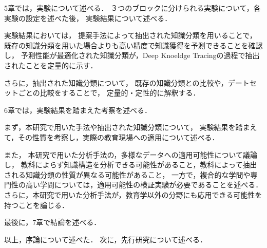 5章では，実験について述べる．
３つのブロックに分けられる実験について，各実験の設定を述べた後，
実験結果について述べる．

実験結果においては，
提案手法によって抽出された知識分類を用いることで，既存の知識分類を用いた場合よりも高い精度で知識獲得を予測できることを確認し，
予測性能が最適化された知識分類が，Deep Knoeldge Tracingの過程で抽出されたことを定量的に示す．

さらに，抽出された知識分類について，
既存の知識分類との比較や，デートセットごとの比較をすることで，
定量的・定性的に解釈する．


6章では，実験結果を踏まえた考察を述べる．

まず，本研究で用いた手法や抽出された知識分類について，
実験結果を踏まえて，その性質を考察し，実際の教育現場への適用について述べる．

また，
本研究で用いた分析手法の，多様なデータへの適用可能性について議論し，
教科によらず知識構造を分析できる可能性があること，教科によって抽出される知識分類の性質が異なる可能性があること，
一方で，複合的な学問や専門性の高い学問については，適用可能性の検証実験が必要であることを述べる．
さらに，本研究で用いた分析手法が，教育学以外の分野にも応用できる可能性を持つことを論じる．


最後に，7章で結論を述べる．



\vvspace
以上，序論について述べた．
次に，先行研究について述べる．


